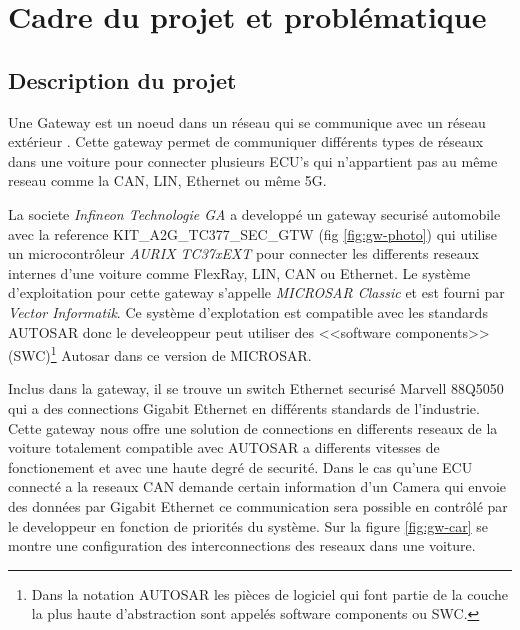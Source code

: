 \section{Cadre du projet et probl\'ematique}

\subsection{Description du projet}

Une Gateway est un noeud dans un réseau qui se communique avec un réseau extérieur \cite{gateway-definition}. Cette gateway permet de communiquer différents types de réseaux dans une voiture pour connecter plusieurs ECU's qui n'appartient pas au même reseau comme la CAN, LIN, Ethernet ou m\^eme 5G. 

La societe \textit{Infineon Technologie GA} a developp\'e un gateway securis\'e automobile avec la reference KIT\_A2G\_TC377\_SEC\_GTW \cite{gateway} (fig \ref{fig:gw-photo}) qui utilise un microcontr\^oleur \textit{AURIX TC37xEXT} pour connecter les differents reseaux internes d'une voiture comme FlexRay, LIN, CAN ou Ethernet. Le syst\`eme d'exploitation pour cette gateway s'appelle \textit{MICROSAR Classic} \cite{vector.microsar} et est fourni par \textit{Vector Informatik}. Ce syst\`eme d'explotation est compatible avec les standards AUTOSAR\cite{autosar-intro} donc le develeoppeur peut utiliser des <<software components>> (SWC)\footnote{Dans la notation AUTOSAR les pièces de logiciel qui font partie de la couche la plus haute d'abstraction sont appel\'es software components ou SWC\cite{swc_man}.} Autosar dans ce version de MICROSAR.

Inclus dans la gateway, il se trouve un switch Ethernet securis\'e Marvell 88Q5050\cite{sw88Q5050} qui a des connections Gigabit Ethernet en différents standards de l'industrie. Cette gateway nous offre une solution de connections en differents reseaux de la voiture totalement compatible avec AUTOSAR a differents vitesses de fonctionement et avec une haute degré de securit\'e. Dans le cas qu'une ECU connect\'e a la reseaux CAN demande certain information d'un Camera qui envoie des donn\'ees par Gigabit Ethernet ce communication sera possible en contr\^ol\'e par le developpeur en fonction de priorit\'es du syst\`eme. Sur la figure \ref{fig:gw-car} se montre une configuration des interconnections des reseaux dans une voiture.


